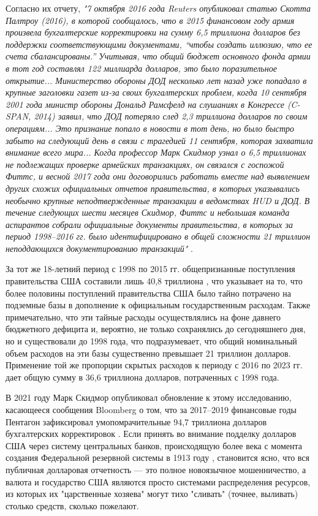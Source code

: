 \documentclass[10pt,twocolumn,letterpaper]{article}
\begin{document}
Согласно их отчету, \textit{"7 октября 2016 года Reuters опубликовал статью Скотта Палтроу (2016), в которой сообщалось, что в 2015 финансовом году армия произвела бухгалтерские корректировки на сумму 6,5 триллиона долларов без поддержки соответствующими документами, “чтобы создать иллюзию, что ее счета сбалансированы.” Учитывая, что общий бюджет основного фонда армии в тот год составлял 122 миллиарда долларов, это было поразительное открытие... Министерство обороны ДОД несколько лет назад уже попадало в крупные заголовки газет из-за своих бухгалтерских проблем, когда 10 сентября 2001 года министр обороны Дональд Рамсфелд на слушаниях в Конгрессе (C-SPAN, 2014) заявил, что ДОД потеряло след 2,3 триллиона долларов по своим операциям... Это признание попало в новости в тот день, но было быстро забыто на следующий день в связи с трагедией 11 сентября, которая захватила внимание всего мира... Когда профессор Марк Скидмор узнал о 6,5 триллионах не подлежащих проверке армейских транзакциях, он связался с госпожой Фиттс, и весной 2017 года они договорились работать вместе над выявлением других схожих официальных отчетов правительства, в которых указывались необычно крупные неподтвержденные транзакции в ведомствах HUD и ДОД. В течение следующих шести месяцев Скидмор, Фиттс и небольшая команда аспирантов собрали официальные документы правительства, в которых за период 1998–2016 гг. было идентифицировано в общей сложности 21 триллион неподдающихся документированию транзакций"} \cite{12}.

За тот же 18-летний период с 1998 по 2015 гг. общепризнанные поступления правительства США составили лишь 40,8 триллиона \cite{15}, что указывает на то, что более половины поступлений правительства США было тайно потрачено на подземные базы в дополнение к официальным государственным расходам. Также примечательно, что эти тайные расходы осуществлялись на фоне давнего бюджетного дефицита и, вероятно, не только сохранялись до сегодняшнего дня, но и существовали до 1998 года, что подразумевает, что общий номинальный объем расходов на эти базы существенно превышает 21 триллион долларов. Применение той же пропорции скрытых расходов к периоду с 2016 по 2023 гг. дает общую сумму в 36,6 триллиона долларов, потраченных с 1998 года.

В 2021 году Марк Скидмор опубликовал обновление к этому исследованию, касающееся сообщения Bloomberg о том, что за 2017–2019 финансовые годы Пентагон зафиксировал умопомрачительные 94,7 триллиона долларов бухгалтерских корректировок \cite{17,18}. Если принять во внимание подделку долларов США через систему центральных банков, происходящую более века с момента создания Федеральной резервной системы в 1913 году \cite{37}, становится ясно, что вся публичная долларовая отчетность — это полное новоязычное мошенничество, а валюта и государство США являются просто системами распределения ресурсов, из которых их "царственные хозяева" могут тихо "сливать" (точнее, выливать) столько средств, сколько пожелают.
\end{document}
